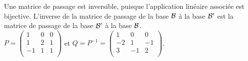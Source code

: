 {\begin{question}
\begin{explanations} Une matrice de passage est inversible, puisque l'application linéaire associée est bijective. L'inverse de la matrice de passage de la base ${\cal {B}}$ à la base ${\cal {B}}'$ est la matrice de passage de la base ${\cal {B}}'$ à la base ${\cal {B}}$.\\
$P = \left(\begin{array}{rcc}
1&0&0\\
1&2&1\\
-1&1&1\\
\end{array}\right)$ et $
Q = P^{-1} = \left(\begin{array}{rcc}
1&0&0\\
-2&1&-1\\
3&-1&2\\
\end{array}\right)$.
\end{explanations}
\end{question}
}

